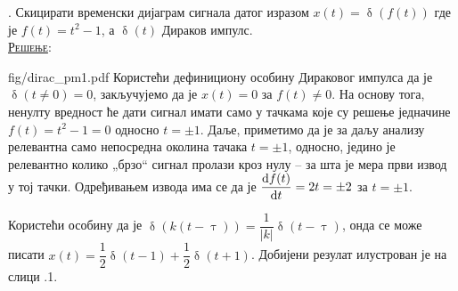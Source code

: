 \noindent
\textbf{\ID}. 
Скицирати временски дијаграм сигнала датог изразом $x(t) = \updelta(f(t))$ где је 
$f(t) = t^2 - 1$, а
$\updelta(t)$ Дираков импулс. \\[2mm]

\textsc{\underline{Решење}}: 

\begin{slikaDesno}
[1]
[$t^2 - 1$ (- - -), $\updelta(t^2 - 1)$ (---)]
{fig/dirac_pm1.pdf}
Користећи дефинициону особину Дираковог импулса да је $\updelta(t \neq 0) = 0$, 
закључујемо да је $x(t) = 0$ за $f(t) \neq 0$. На основу тога, ненулту вредност ће дати сигнал имати 
само у тачкама које су решење једначине $f(t) = t^2 - 1 = 0$ односно $t = \pm 1$.  
Даље, приметимо да је за даљу анализу релевантна само непосредна околина 
тачака $t = \pm 1$, односно, једино је релевантно колико „брзо“ сигнал пролази
кроз нулу -- за шта је мера први извод у тој тачки. Одређивањем извода  има се да је 
$\dfrac{{\rm d} f(t)}{{\rm d} t} = 2t = \pm 2$ за $t = \pm 1$. 
\end{slikaDesno}
Користећи особину да је $\updelta( k(t - \uptau) ) = \dfrac{1}{|k|} \updelta(t - \uptau)$, онда 
се може писати 
${x(t) = \dfrac12 \updelta(t - 1) + \dfrac12 \updelta(t + 1)}$. Добијени резулат илустрован је на слици 
\ID.1. 